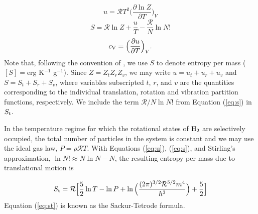 \begin{equation}
\label{eq:u}
u=\mathcal{R}T^2 \Big(\frac{\partial \ln{Z}}{\partial T}\Big)_{V}
\end{equation}
\begin{equation}
\label{eq:s}
S=\mathcal{R} \ln{Z} + \frac{u}{T}-\frac{\mathcal{R}}{N} \ln N!
\end{equation}
\begin{equation}
\label{eq:cv}
c_{\rm V}=\Big(\frac{\partial u}{\partial T}\Big)_{V}.
\end{equation}
Note that, following the convention of \citet{saumon95}, we use $S$ to denote entropy per mass ($[S]=$erg K$^{-1}$ g$^{-1}$).  Since $Z=Z_t Z_r Z_v$, we may write $u=u_t+u_r+u_v$ and $S=S_t+S_r+S_v$, where variables subscripted $t$, $r$, and $v$ are the quantities corresponding to the individual translation, rotation and vibration partition functions, respectively. We include the term $\mathcal{R}/N \ln N!$ from Equation (\ref{eq:s}) in $S_{\rm t}$.


 In the temperature regime for which the rotational states of $\rm{H}_2$ are selectively occupied, the total number of particles in the system is constant and we may use the ideal gas law, $P=\rho \mathcal{R} T$. With Equations (\ref{eq:u}), (\ref{eq:s}), and Stirling's approximation, $\ln N! \approx N \ln N-N$, the resulting entropy per mass due to translational motion is

\begin{equation}
\label{eq:st}
S_{\rm t}=\mathcal{R} \Big[ \frac{5}{2} \ln{T} - \ln{P} + \ln \Big( \frac{(2 \pi)^{3/2} \mathcal{R}^{5/2} m^4}{h^3}\Big) +\frac{5}{2} \Big]
\end{equation}
Equation (\ref{eq:st}) is known as the Sackur-Tetrode formula. %

